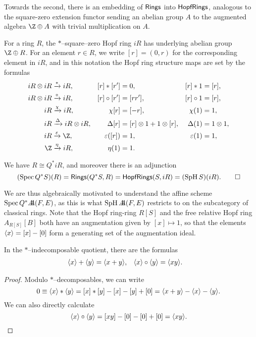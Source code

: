 Towards the second, there is an embedding of $\mathsf{Rings}$ into $\mathsf{HopfRings}$, analogous to the square-zero extension functor sending an abelian group $A$ to the augmented algebra $\Z \oplus A$ with trivial multiplication on $A$.

\begin{definition}
For a ring $R$, the $\ast$--square--zero Hopf ring $iR$ has underlying abelian group $\Z \oplus R$.  For an element $r \in R$, we write $[r] = (0, r)$ for the corresponding element in $iR$, and in this notation the Hopf ring structure maps are set by the formulas
\begin{align*}
iR \otimes iR & \xrightarrow{\ast} iR, & [r] \ast [r'] & = 0, & [r] \ast 1 & = [r], \\
iR \otimes iR & \xrightarrow{\circ} iR, & [r] \circ [r'] & = [rr'], & [r] \circ 1 & = [r], \\
iR & \xrightarrow{\chi} iR, & \chi[r] & = [-r], & \chi(1) & = 1, \\
iR & \xrightarrow{\Delta} iR \otimes iR, & \Delta [r] & = [r] \otimes 1 + 1 \otimes [r], & \Delta(1) & = 1 \otimes 1, \\
iR & \xrightarrow{\eps} \Z, & \eps([r]) & = 1, & \eps(1) & = 1, \\
\Z & \xrightarrow{\eta} iR, & \eta(1) & = 1.
\end{align*}
\end{definition}

\begin{lemma}
We have $R \cong Q^* i R$, and moreover there is an adjunction \[(\operatorname{Spec} Q^* S)(R) = \mathsf{Rings}(Q^* S, R) = \mathsf{HopfRings}(S, iR) = (\operatorname{SpH} S)(iR). \qed\]
\end{lemma}

We are thus algebraically motivated to understand the affine scheme $\operatorname{Spec} Q^* A\!\!\!A(F, E)$, as this is what $\operatorname{SpH} A\!\!\!A(F, E)$ restricts to on the subcategory of classical rings.  Note that the Hopf ring-ring $R[S]$ and the free relative Hopf ring $A_{R[S]}[B]$ both have an augmentation given by $[x] \mapsto 1$, so that the elements $\langle x\rangle = [x] - [0]$ form a generating set of the augmentation ideal.
\begin{lemma}\label{ArithmeticInQAst}
In the $\ast$--indecomposable quotient, there are the formulas
\begin{align*}
\langle x\rangle + \langle y\rangle & = \langle x + y\rangle, &
\langle x\rangle \circ \langle y\rangle & = \langle x y\rangle.
\end{align*}
\end{lemma}
\begin{proof}
Modulo $\ast$--decomposables, we can write \[0 \equiv \langle x\rangle \ast \langle y\rangle = [x] \ast [y] - [x] - [y] + [0] = \langle x + y\rangle - \langle x\rangle - \langle y\rangle.\]  We can also directly calculate \[\langle x\rangle \circ \langle y\rangle = [x y] - [0] - [0] + [0] = \langle x y\rangle. \qedhere\]
\end{proof}

